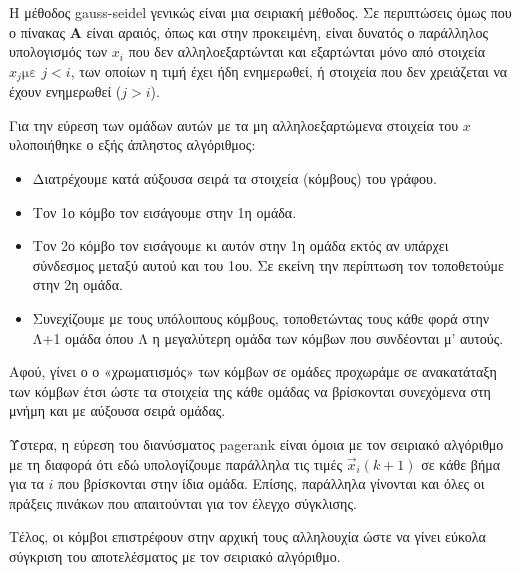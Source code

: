 Η μέθοδος gauss-seidel γενικώς είναι μια σειριακή μέθοδος. Σε περιπτώσεις όμως που ο πίνακας $\bm{A}$ είναι αραιός, όπως και στην προκειμένη, είναι δυνατός ο παράλληλος υπολογισμός των $x_i$ που δεν αλληλοεξαρτώνται και εξαρτώνται μόνο από στοιχεία $x_j\text{με } j < i$, των οποίων η τιμή έχει ήδη ενημερωθεί, ή στοιχεία που δεν χρειάζεται να έχουν ενημερωθεί ($j > i$).

Για την εύρεση των ομάδων αυτών με τα μη αλληλοεξαρτώμενα στοιχεία του $x$ υλοποιήθηκε ο εξής άπληστος αλγόριθμος:

\begin{itemize}
\item Διατρέχουμε κατά αύξουσα σειρά τα στοιχεία (κόμβους) του γράφου.
\item Τον 1ο κόμβο τον εισάγουμε στην 1η ομάδα.
\item Tον 2ο κόμβο τον εισάγουμε κι αυτόν στην 1η ομάδα εκτός αν υπάρχει σύνδεσμος μεταξύ αυτού και του 1ου. Σε εκείνη την περίπτωση τον τοποθετούμε στην 2η ομάδα.
\item Συνεχίζουμε με τους υπόλοιπους κόμβους, τοποθετώντας τους κάθε φορά στην Λ+1 ομάδα όπου Λ η μεγαλύτερη ομάδα των κόμβων που συνδέονται μ' αυτούς.
\end{itemize}

Αφού, γίνει ο ο «χρωματισμός» των κόμβων σε ομάδες προχωράμε σε ανακατάταξη των κόμβων έτσι ώστε τα στοιχεία της κάθε ομάδας να βρίσκονται συνεχόμενα στη μνήμη και με αύξουσα σειρά ομάδας.

Ύστερα, η εύρεση του διανύσματος pagerank είναι όμοια με τον σειριακό αλγόριθμο με τη διαφορά ότι εδώ υπολογίζουμε παράλληλα τις τιμές $\vec{x}_i(k+1)$ σε κάθε βήμα για τα $i$ που βρίσκονται στην ίδια ομάδα. Επίσης, παράλληλα γίνονται και όλες οι πράξεις πινάκων που απαιτούνται για τον έλεγχο σύγκλισης.

Τέλος, οι κόμβοι επιστρέφουν στην αρχική τους αλληλουχία ώστε να γίνει εύκολα σύγκριση του αποτελέσματος με τον σειριακό αλγόριθμο.
